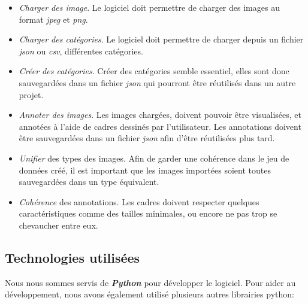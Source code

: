 \documentclass{rapport}
\begin{document}
            \begin{itemize}

                \item \textit{Charger des image}. Le logiciel doit permettre de charger des images au format \textit{jpeg} et \textit{png}.

                \item \textit{Charger des catégories}. Le logiciel doit permettre de charger depuis un fichier \textit{json} ou \textit{csv}, différentes catégories.

                \item \textit{Créer des catégories}. Créer des catégories semble essentiel, elles sont donc sauvegardées dans un fichier \textit{json} qui pourront être réutilisés dans un autre projet.

                \item \textit{Annoter des images}. Les images chargées, doivent pouvoir être visualisées, et annotées à l'aide de cadres dessinés par l'utilisateur. Les annotations doivent être sauvegardées dans un fichier \textit{json} afin d'être réutilisées plus tard.

                \item \textit{Unifier} des types des images. Afin de garder une cohérence dans le jeu de données créé, il est important que les images importées soient toutes sauvegardées dans un type équivalent.

                \item \textit{Cohérence} des annotations. Les cadres doivent respecter quelques caractéristiques comme des tailles minimales, ou encore ne pas trop se chevaucher entre eux.
                
            \end{itemize}
                    
        \subsection{Technologies utilisées}
        
            Nous nous sommes servis de \textbf{\textit{Python}} pour développer le logiciel. Pour aider au développement, nous avons également utilisé plusieurs autres librairies python\space:
            
\end{document}
